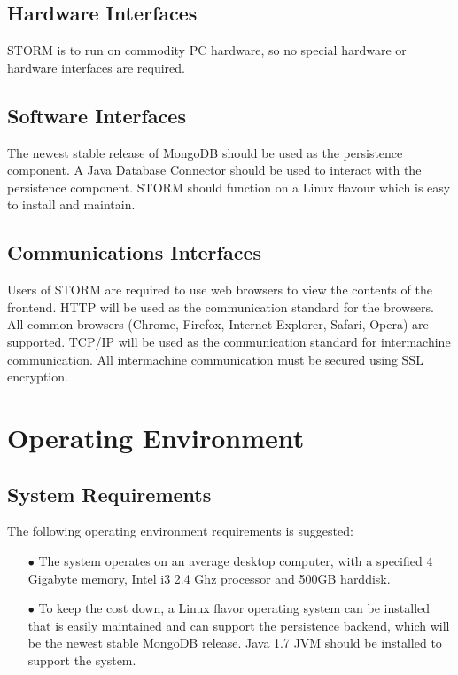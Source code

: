 \documentclass[hidelinks, 12pt, oneside]{article}
\begin{document}
\subsection{Hardware Interfaces}
STORM is to run on commodity PC hardware, so no special hardware or hardware interfaces
are required.

\subsection{Software Interfaces}
The newest stable release of MongoDB should be used as the persistence component. A Java Database Connector should be used to interact with the persistence component. STORM should function on a Linux flavour which is easy to install and maintain.

\subsection{Communications Interfaces}
Users of STORM are required to use web browsers to view the contents of the frontend. HTTP will be used as the communication standard for the browsers. All common browsers (Chrome, Firefox, Internet Explorer, Safari, Opera) are supported. TCP/IP will be used as the communication standard for intermachine communication. All intermachine communication must be secured using SSL encryption.

\section{Operating Environment}
\subsection{System Requirements}
The following operating environment requirements is suggested:
\begin{itemize}
\item[$\bullet$]The system operates on an average desktop computer, with a specified 4 Gigabyte memory, Intel i3 2.4 Ghz processor and 500GB harddisk.
\item[$\bullet$]To keep the cost down, a Linux flavor operating system can be installed that is easily maintained and can support the persistence backend, which will be the newest stable MongoDB release. Java 1.7 JVM should be installed to support the system.
\end{itemize}
\end{document}
